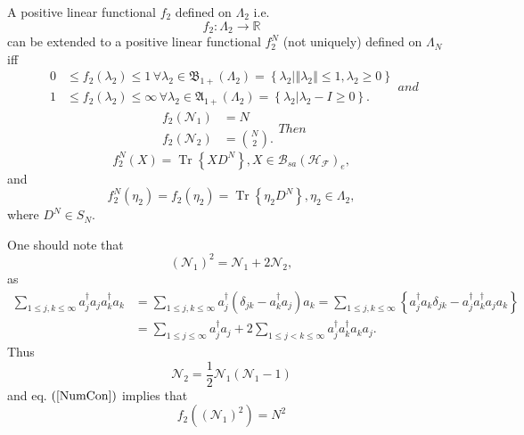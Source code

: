\documentclass[aps,preprint]{revtex4}%
\begin{document}
A positive linear functional $f_{2}$ defined on $\Lambda_{2}$ i.e.
\begin{equation}
f_{2}:\Lambda_{2}\rightarrow\mathbb{R}%
\end{equation}
can be extended to a positive linear functional $f_{2}^{N}$ (not uniquely)
defined on $\Lambda_{N}$ iff
\begin{subequations}
\label{SORDcon}%
\begin{align}
0  &  \leq f_{2}\left(  \lambda_{2}\right)  \leq1\,\forall\lambda_{2}%
\in\mathfrak{B}_{1+}\left(  \Lambda_{2}\right)  =\left\{  \left.  \lambda
_{2}\right\vert \left\Vert \lambda_{2}\right\Vert \leq1,\lambda_{2}%
\geq0\right\} \label{con2.1}\\
1  &  \leq f_{2}\left(  \lambda_{2}\right)  \leq\infty\,\forall\lambda_{2}%
\in\mathfrak{A}_{1+}\left(  \Lambda_{2}\right)  =\left\{  \left.  \lambda
_{2}\right\vert \lambda_{2}-I\geq0\right\}  . \label{con2.2}%
\end{align}
and
\end{subequations}
\begin{subequations}
\label{NumCon}%
\begin{align}
f_{2}\left(  \mathcal{N}_{1}\right)   &  =N\\
f_{2}\left(  \mathcal{N}_{2}\right)   &  =\binom{N}{2}.
\end{align}
Then%
\end{subequations}
\begin{equation}
f_{2}^{N}\left(  X\right)  =\operatorname*{Tr}\left\{  XD^{N}\right\}
,X\in\mathcal{B}_{sa}\left(  \mathcal{H}_{\mathcal{F}}\right)  _{e},
\end{equation}
and
\begin{equation}
f_{2}^{N}\left(  \eta_{2}\right)  =f_{2}\left(  \eta_{2}\right)
=\operatorname*{Tr}\left\{  \eta_{2}D^{N}\right\}  ,\eta_{2}\in\Lambda_{2},
\end{equation}
where $D^{N}\in S_{N}.$

One should note that
\begin{equation}
\left(  \mathcal{N}_{1}\right)  ^{2}=\mathcal{N}_{1}+2\mathcal{N}_{2},
\end{equation}
as%
\begin{align}
\sum_{1\leq j,k\leq\infty}a_{j}^{\dagger}a_{j}a_{k}^{\dagger}a_{k}  &
=\sum_{1\leq j,k\leq\infty}a_{j}^{\dagger}\left(  \delta_{jk}-a_{k}^{\dagger
}a_{j}\right)  a_{k}=\sum_{1\leq j,k\leq\infty}\left\{  a_{j}^{\dagger}%
a_{k}\delta_{jk}-a_{j}^{\dagger}a_{k}^{\dagger}a_{j}a_{k}\right\} \nonumber\\
&  =\sum_{1\leq j\leq\infty}a_{j}^{\dagger}a_{j}+2\sum_{1\leq j<k\leq\infty
}a_{j}^{\dagger}a_{k}^{\dagger}a_{k}a_{j}.
\end{align}
Thus
\begin{equation}
\mathcal{N}_{2}=\frac{1}{2}\mathcal{N}_{1}\left(  \mathcal{N}_{1}-1\right)
\end{equation}
and eq. $\left(  \ref{NumCon}\right)  $ implies that
\begin{equation}
f_{2}\left(  \left(  \mathcal{N}_{1}\right)  ^{2}\right)  =N^{2}
\label{PureNum2}%
\end{equation}
\end{document}

